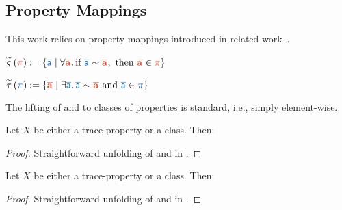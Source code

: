 \subsection{Property Mappings}

This work relies on property mappings introduced in related work~\cite{abate2021extacc}.

\begin{definition}{}
  $ 
    \mapUniversal{\sim}{\trgProperty} := 
      \lrbraces{\srcTrace \mid %
        \forall \trgTrace\ldotp \text{if }\xrelTraces{\srcTrace}{\trgTrace}, \text{ then }%
        \trgTrace\in\trgProperty
      }
  $
\end{definition}
\begin{definition}{}
  $ 
    \mapExistential{\sim}{\srcProperty} := 
      \lrbraces{\trgTrace \mid %
        \exists \srcTrace\ldotp \xrelTraces{\srcTrace}{\trgTrace} \text{ and }%
        \srcTrace\in\srcProperty
      }
  $
\end{definition}

The lifting of  and  to classes of properties is standard, i.e., simply element-wise.

\begin{lemma}[\Coqed]{}
  Let $X$ be either a trace-property or a class. Then:
  \begin{goals}
  \end{goals}
\end{lemma}
\begin{proof}
  Straightforward unfolding of  and  in .
\end{proof}
\begin{lemma}[\Coqed]{}
  Let $X$ be either a trace-property or a class. Then:
  \begin{goals}
  \end{goals}
\end{lemma}
\begin{proof}
  Straightforward unfolding of  and  in .
\end{proof}

